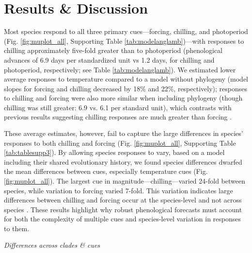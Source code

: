 \documentclass[11pt]{article}
\begin{document}
\section*{Results \& Discussion}
Most species respond to all three primary cues---forcing, chilling, and photoperiod (Fig. \ref{fig:muplot_all}, Supporting Table \ref{tab:modelanglamb})---with responses to chilling approximately five-fold greater than to photoperiod (phenological advances of 6.9 days per standardized unit vs 1.2 days, for chilling and photoperiod, respectively; see Table \ref{tab:modelanglamb}). We estimated lower average responses to temperature compared to a model without phylogeny (model slopes for forcing and chilling decreased by 18\% and 22\%, respectively); responses to chilling and forcing were also more similar when including phylogeny (though chilling was still greater: 6.9 vs. 6.1 per standard unit), which contrasts with previous results suggesting chilling responses are much greater than forcing  \citep{Laube:2014a,ettinger2020}. 

These average estimates, however, fail to capture the large differences in species' responses to both chilling and forcing (Fig. \ref{fig:muplot_all}, Supporting Table \ref{tab:tablesupp3}). By allowing species responses to vary, based on a model including their shared evolutionary history, we found species differences dwarfed the mean differences between cues, especially temperature cues (Fig. \ref{fig:muplot_all}). The largest cue in magnitude---chilling---varied 24-fold between species, while variation to forcing varied 7-fold. This variation indicates large differences between chilling and forcing occur at the species-level and not across species \citep[as previously suggested][]{Laube:2014a,ettinger2020}. These results highlight why robust phenological forecasts must account for both the complexity of multiple cues and species-level variation in responses to them.

\emph{Differences across clades \& cues}
\end{document}
